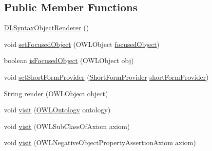 \subsection*{Public Member Functions}
\begin{DoxyCompactItemize}
\item 
\hyperlink{classuk_1_1ac_1_1manchester_1_1cs_1_1owlapi_1_1dlsyntax_1_1_d_l_syntax_object_renderer_aa48f645b6ff7a0e5f2d01092c26a8932}{D\-L\-Syntax\-Object\-Renderer} ()
\item 
void \hyperlink{classuk_1_1ac_1_1manchester_1_1cs_1_1owlapi_1_1dlsyntax_1_1_d_l_syntax_object_renderer_a41f98b1ec3037fefee25d1bc47346ca8}{set\-Focused\-Object} (O\-W\-L\-Object \hyperlink{classuk_1_1ac_1_1manchester_1_1cs_1_1owlapi_1_1dlsyntax_1_1_d_l_syntax_object_renderer_af8e0c40164f96606b42bea3fa1bcf4e7}{focused\-Object})
\item 
boolean \hyperlink{classuk_1_1ac_1_1manchester_1_1cs_1_1owlapi_1_1dlsyntax_1_1_d_l_syntax_object_renderer_abb600e936722fc48ec716643dd168200}{is\-Focused\-Object} (O\-W\-L\-Object obj)
\item 
void \hyperlink{classuk_1_1ac_1_1manchester_1_1cs_1_1owlapi_1_1dlsyntax_1_1_d_l_syntax_object_renderer_aaa9e184dae3a62e359e84b18c69db28e}{set\-Short\-Form\-Provider} (\hyperlink{interfaceorg_1_1semanticweb_1_1owlapi_1_1util_1_1_short_form_provider}{Short\-Form\-Provider} \hyperlink{classuk_1_1ac_1_1manchester_1_1cs_1_1owlapi_1_1dlsyntax_1_1_d_l_syntax_object_renderer_a6f46cca6324fcd9d0201342f672bc760}{short\-Form\-Provider})
\item 
String \hyperlink{classuk_1_1ac_1_1manchester_1_1cs_1_1owlapi_1_1dlsyntax_1_1_d_l_syntax_object_renderer_a35fa2fce3046a025b15837f594a35f42}{render} (O\-W\-L\-Object object)
\item 
void \hyperlink{classuk_1_1ac_1_1manchester_1_1cs_1_1owlapi_1_1dlsyntax_1_1_d_l_syntax_object_renderer_a08e6f3c7142aea980cee8f0b3ccd4e85}{visit} (\hyperlink{interfaceorg_1_1semanticweb_1_1owlapi_1_1model_1_1_o_w_l_ontology}{O\-W\-L\-Ontology} ontology)
\item 
void \hyperlink{classuk_1_1ac_1_1manchester_1_1cs_1_1owlapi_1_1dlsyntax_1_1_d_l_syntax_object_renderer_a4d1e3f4483541a4902690d8e6c17d6d4}{visit} (O\-W\-L\-Sub\-Class\-Of\-Axiom axiom)
\item 
void \hyperlink{classuk_1_1ac_1_1manchester_1_1cs_1_1owlapi_1_1dlsyntax_1_1_d_l_syntax_object_renderer_aeb081a65106ecf931331b85bbcecad72}{visit} (O\-W\-L\-Negative\-Object\-Property\-Assertion\-Axiom axiom)
\item 

\end{DoxyCompactItemize}
